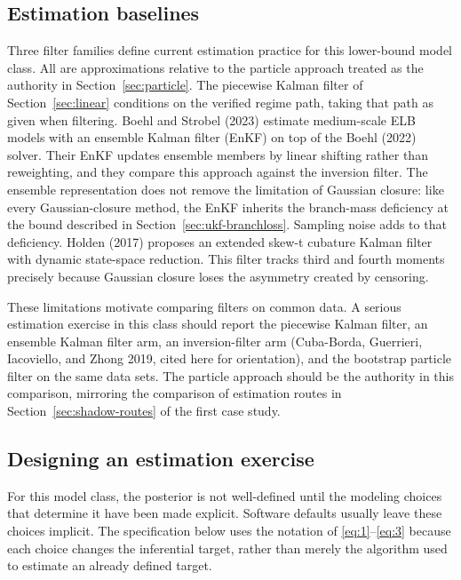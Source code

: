 \documentclass[11pt]{article}
\begin{document}
\subsection{Estimation baselines}
\label{sec:nk-baselines}

Three filter families define current estimation practice for this lower-bound model class. All are approximations relative to the particle approach treated as the authority in Section~\ref{sec:particle}. The piecewise Kalman filter of Section~\ref{sec:linear} conditions on the verified regime path, taking that path as given when filtering. Boehl and Strobel (2023) estimate medium-scale ELB models with an ensemble Kalman filter (EnKF) on top of the Boehl (2022) solver. Their EnKF updates ensemble members by linear shifting rather than reweighting, and they compare this approach against the inversion filter. The ensemble representation does not remove the limitation of Gaussian closure: like every Gaussian-closure method, the EnKF inherits the branch-mass deficiency at the bound described in Section~\ref{sec:ukf-branchloss}. Sampling noise adds to that deficiency. Holden (2017) proposes an extended skew-t cubature Kalman filter with dynamic state-space reduction. This filter tracks third and fourth moments precisely because Gaussian closure loses the asymmetry created by censoring.

These limitations motivate comparing filters on common data. A serious estimation exercise in this class should report the piecewise Kalman filter, an ensemble Kalman filter arm, an inversion-filter arm (Cuba-Borda, Guerrieri, Iacoviello, and Zhong 2019, cited here for orientation), and the bootstrap particle filter on the same data sets. The particle approach should be the authority in this comparison, mirroring the comparison of estimation routes in Section~\ref{sec:shadow-routes} of the first case study.

\subsection{Designing an estimation exercise}
\label{sec:nk-design}

For this model class, the posterior is not well-defined until the modeling choices that determine it have been made explicit. Software defaults usually leave these choices implicit. The specification below uses the notation of \eqref{eq:1}--\eqref{eq:3} because each choice changes the inferential target, rather than merely the algorithm used to estimate an already defined target.
\end{document}

